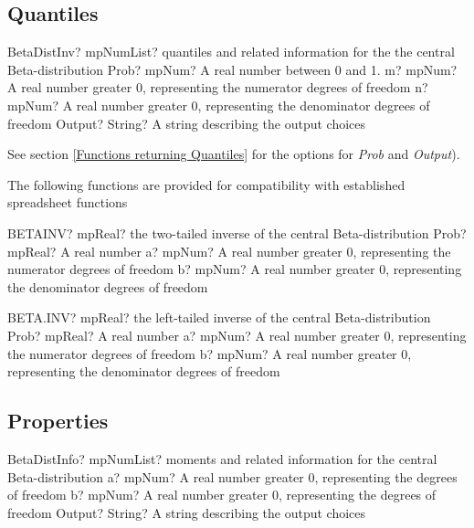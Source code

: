 \subsection{Quantiles}

\begin{mpFunctionsExtract}
	\mpFunctionFourNotImplemented
	{BetaDistInv? mpNumList? quantiles and related information for the the central Beta-distribution}
	{Prob? mpNum? A real number between 0 and 1.}
	{m? mpNum? A real number greater 0, representing the numerator  degrees of freedom}
	{n? mpNum? A real number greater 0, representing the denominator degrees of freedom}
	{Output? String? A string describing the output choices}
\end{mpFunctionsExtract}

See section \ref{Functions returning Quantiles} for the options for  {\itshape\sffamily Prob} and {\itshape\sffamily Output}). 

\vspace{0.3cm}

The following functions are provided for compatibility with established spreadsheet functions

\vspace{0.3cm}
\begin{mpFunctionsExtract}
	\mpWorksheetFunctionThree
	{BETAINV? mpReal? the two-tailed inverse of the central Beta-distribution}
	{Prob? mpReal? A real number}
	{a? mpNum? A real number greater 0, representing the numerator  degrees of freedom}
	{b? mpNum? A real number greater 0, representing the denominator degrees of freedom}
\end{mpFunctionsExtract}

\vspace{0.6cm}
\begin{mpFunctionsExtract}
	\mpWorksheetFunctionThree
	{BETA.INV? mpReal? the left-tailed inverse of the central Beta-distribution}
	{Prob? mpReal? A real number}
	{a? mpNum? A real number greater 0, representing the numerator  degrees of freedom}
	{b? mpNum? A real number greater 0, representing the denominator degrees of freedom}
\end{mpFunctionsExtract}


\subsection{Properties}
\label{BetaDistributionProperties}


\begin{mpFunctionsExtract}
	\mpFunctionThreeNotImplemented
	{BetaDistInfo? mpNumList? moments and related information for the central Beta-distribution}
	{a? mpNum? A real number greater 0, representing the degrees of freedom}
	{b? mpNum? A real number greater 0, representing the degrees of freedom}
	{Output? String? A string describing the output choices}
\end{mpFunctionsExtract}

